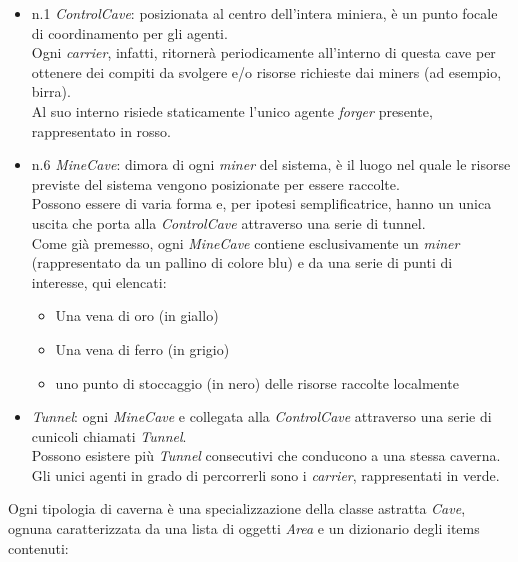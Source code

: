 \documentclass{llncs}
\begin{document}
\begin{itemize}
	\item n.1 \textit{ControlCave}: posizionata al centro dell'intera miniera, è un punto focale di coordinamento per gli agenti.\\
	Ogni \textit{carrier}, infatti, ritornerà periodicamente all'interno di questa cave per ottenere dei compiti da svolgere e/o risorse richieste dai miners (ad esempio, birra).\\Al suo interno risiede staticamente l'unico agente \textit{forger} presente, rappresentato in rosso.\\
	\item n.6 \textit{MineCave}: dimora di ogni \textit{miner} del sistema, è il luogo nel quale le risorse previste del sistema vengono posizionate per essere raccolte.\\ Possono essere di varia forma e, per ipotesi semplificatrice, hanno un unica uscita che porta alla \textit{ControlCave} attraverso una serie di tunnel.\\
	Come già premesso, ogni \textit{MineCave} contiene esclusivamente un \textit{miner} (rappresentato da un pallino di colore blu) e da una serie di punti di interesse, qui elencati:
	\begin{itemize}
		\item Una vena di oro (in giallo)
		\item Una vena di ferro (in grigio)
		\item uno punto di stoccaggio (in nero) delle risorse raccolte localmente
	\end{itemize}\vspace*{0.4cm}
	
	\item \textit{Tunnel}: ogni \textit{MineCave} e collegata alla \textit{ControlCave} attraverso una serie di cunicoli chiamati \textit{Tunnel}.\\ Possono esistere più \textit{Tunnel} consecutivi che conducono a una stessa caverna.\\ Gli unici agenti in grado di percorrerli sono i \textit{carrier}, rappresentati in verde.
\end{itemize}
Ogni tipologia di caverna è una specializzazione della classe astratta \textit{Cave}, ognuna caratterizzata da una lista di oggetti \textit{Area} e un dizionario degli items contenuti:



\newpage
\end{document}
